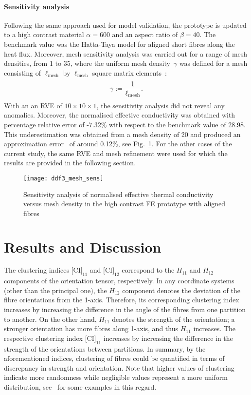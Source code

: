 \bl

	\paragraph{Sensitivity analysis} Following the same approach used for model validation, the prototype is updated to a high contrast material $\alpha=600$ and an aspect ratio of $\beta=40$. The benchmark value was the Hatta-Taya model for aligned short fibres along the heat flux. Moreover, mesh sensitivity analysis was carried out for a range of mesh densities, from 1 to 35, where the uniform mesh density~$\gamma$ was defined for a mesh consisting of $\ell_\text{mesh}$ by $\ell_\text{mesh}$ square matrix elements~\autocite{Javanbakht.2018}:
	\begin{equation}
	\gamma\mathrel{:=}\frac{1}{\ell_\text{mesh}}.
	\end{equation}
	With an an RVE of $10\times 10\times 1$, the sensitivity analysis did not reveal any anomalies. Moreover, the normalised effective conductivity was obtained with percentage relative error of -7.32\% with respect to the benchmark value of 28.98. This underestimation was obtained from a mesh density of 20 and produced an approximation error~\autocite{Chapra.2015} of around 0.12\%, see Fig.~\ref{fig:sensitivty}. For the other cases of the current study, the same RVE and mesh refinement were used for which the results are provided in the following section.
	
\begin{figure}[h]{}
  \centering
\texttt{[image: ddf3\_mesh\_sens]}
  \caption{Sensitivity analysis of normalised effective thermal conductivity versus mesh density in the high contrast FE prototype with aligned fibres}
  \label{fig:sensitivty}
\end{figure}



\red
\section{Results and Discussion}
	The clustering indices ${\text{[CI]}}_{11}$ and ${\text{[CI]}}_{12}$ correspond to the $H_{11}$ and $H_{12}$ components of the orientation tensor, respectively. In any coordinate systems (other than the principal one), the $H_{12}$ component denotes the deviation of the fibre orientations from the 1-axis. Therefore, its corresponding clustering index increases by increasing the difference in the angle of the fibres from one partition to another. On the other hand, $H_{11}$ denotes the strength of the orientation; a stronger orientation has more fibres along 1-axis, and thus $H_{11}$ increases. The respective clustering index ${\text{[CI]}}_{11}$ increases by increasing the difference in the strength of the orientations between partitions. In summary, by the aforementioned indices, clustering of fibres could be quantified in terms of discrepancy in strength and orientation. Note that higher values of clustering indicate more randomness while negligible values represent a more uniform distribution, see~\autocite{Ranganathan.1990} for some examples in this regard. 
	
